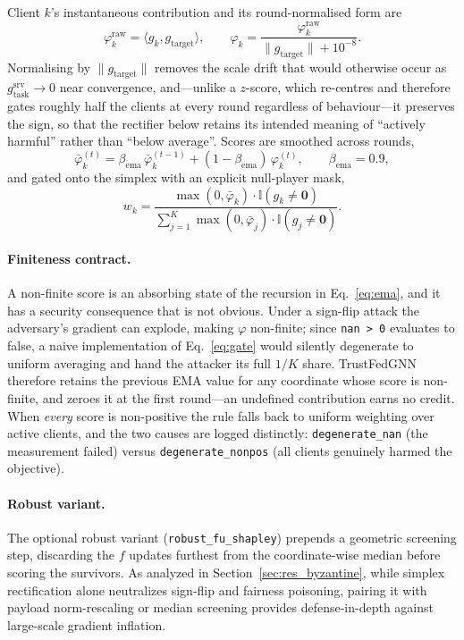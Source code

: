 \documentclass[preprint,12pt]{elsarticle}
\theoremstyle{plain}
\theoremstyle{definition}
\theoremstyle{remark}
\begin{document}
Client $k$'s instantaneous contribution and its round-normalised form are
\begin{equation}
\varphi_k^{\mathrm{raw}} = \langle g_k, g_{\mathrm{target}}\rangle,
\qquad
\varphi_k = \frac{\varphi_k^{\mathrm{raw}}}{\lVert g_{\mathrm{target}}\rVert + 10^{-8}} .
\label{eq:score}
\end{equation}
Normalising by $\lVert g_{\mathrm{target}}\rVert$ removes the scale drift that would otherwise occur as $g_{\mathrm{task}}^{\mathrm{srv}} \to 0$ near convergence, and---unlike a $z$-score, which re-centres and therefore gates roughly half the clients at every round regardless of behaviour---it preserves the sign, so that the rectifier below retains its intended meaning of ``actively harmful'' rather than ``below average''. Scores are smoothed across rounds,
\begin{equation}
\bar{\varphi}_k^{(t)} = \beta_{\mathrm{ema}}\, \bar{\varphi}_k^{(t-1)} + (1 - \beta_{\mathrm{ema}})\, \varphi_k^{(t)},
\qquad \beta_{\mathrm{ema}} = 0.9 ,
\label{eq:ema}
\end{equation}
and gated onto the simplex with an explicit null-player mask,
\begin{equation}
w_k = \frac{\max(0,\bar{\varphi}_k)\cdot\mathbb{I}(g_k \neq \bm{0})}{\sum_{j=1}^{K}\max(0,\bar{\varphi}_j)\cdot\mathbb{I}(g_j \neq \bm{0})} .
\label{eq:gate}
\end{equation}

\paragraph{Finiteness contract.} A non-finite score is an absorbing state of the recursion in Eq.~\eqref{eq:ema}, and it has a security consequence that is not obvious. Under a sign-flip attack the adversary's gradient can explode, making $\varphi$ non-finite; since \texttt{nan > 0} evaluates to false, a naive implementation of Eq.~\eqref{eq:gate} would silently degenerate to uniform averaging and hand the attacker its full $1/K$ share. TrustFedGNN therefore retains the previous EMA value for any coordinate whose score is non-finite, and zeroes it at the first round---an undefined contribution earns no credit. When \emph{every} score is non-positive the rule falls back to uniform weighting over active clients, and the two causes are logged distinctly: \texttt{degenerate\_nan} (the measurement failed) versus \texttt{degenerate\_nonpos} (all clients genuinely harmed the objective).

\paragraph{Robust variant.} The optional robust variant (\texttt{robust\_fu\_shapley}) prepends a geometric screening step, discarding the $f$ updates furthest from the coordinate-wise median before scoring the survivors. As analyzed in Section~\ref{sec:res_byzantine}, while simplex rectification alone neutralizes sign-flip and fairness poisoning, pairing it with payload norm-rescaling or median screening provides defense-in-depth against large-scale gradient inflation.
\end{document}
